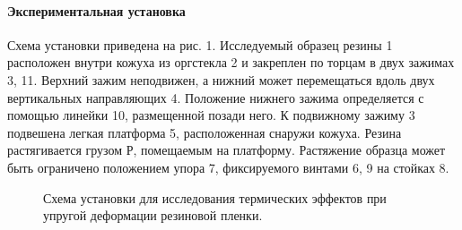 \documentclass[a4paper,12pt]{article}
\begin{document}
\paragraph{Экспериментальная установка\\}
Схема установки приведена на рис. 1. Исследуемый образец резины 1 расположен внутри кожуха из оргстекла 2 и закреплен по торцам в двух зажимах 3, 11. Верхний зажим неподвижен, а нижний может перемещаться вдоль двух вертикальных направляющих 4. Положение нижнего зажима определяется с помощью линейки 10, размещенной позади него. К подвижному зажиму 3 подвешена легкая платформа 5, расположенная снаружи кожуха. Резина растягивается грузом Р, помещаемым на платформу. Растяжение образца может быть ограничено положением упора 7, фиксируемого винтами 6, 9 на стойках 8.	\begin{figure}[h]
	\caption{Схема установки для исследования термических эффектов при упругой деформации резиновой пленки.}
	\label{ris:ustanovka}
\end{figure}
\end{document}
